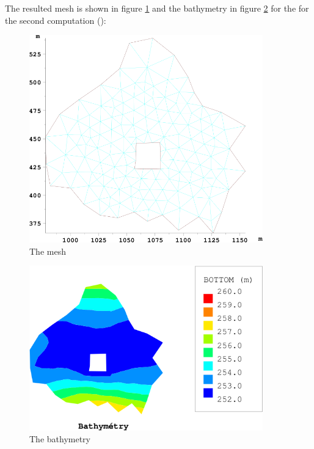 The resulted mesh is shown in figure \ref{fig:trigridmaildet:mesh2} and the
bathymetry in figure \ref{fig:trigridmaildet:bathy2} for the for the second
computation ():
\begin{figure}[H]%
\begin{center}
%
  \includegraphics[width=0.9\textwidth]{mesh2}
%
\end{center}
\caption
{The mesh}
\label{fig:trigridmaildet:mesh2}
\end{figure}
%
\begin{figure}[H]%
\begin{center}
%
  \includegraphics[width=0.9\textwidth]{bathy2}
%
\end{center}
\caption
{The bathymetry}
\label{fig:trigridmaildet:bathy2}
\end{figure}
%
